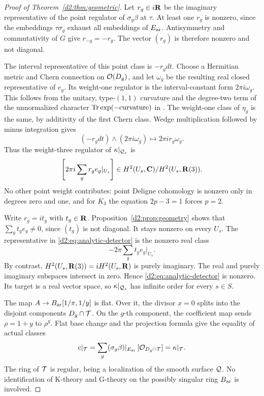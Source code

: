 \begin{proof}[Proof of Theorem~\ref{d2:thm:geometric}]
Let \(r_g\in i\mathbf{R}\) be the imaginary representative of the point
regulator of \(\sigma_g\beta\) at \(\tau\).
At least one \(r_g\) is nonzero, since the embeddings
\(\tau\sigma_g\) exhaust all embeddings of \(E_{\mathrm{ar}}\).
Antisymmetry and commutativity of \(G\) give \(r_{-g}=-r_g\).
The vector \((r_g)\) is therefore nonzero and not diagonal.

The interval representative of this point class is \(-r_gdt\).
Choose a Hermitian metric and Chern connection on \(\mathcal O(D_g)\),
and let \(\omega_g\) be the resulting real closed representative of
\(e_g\). Its weight-one regulator is the interval-constant form
\(2\pi i\omega_g\).
This follows from the unitary, type-\((1,1)\) curvature and the
degree-two term of the unnormalized character
\(\operatorname{Tr}\exp(-\mathrm{curvature})\) in
\cite[Definitions~2.16--2.20]{BunkeTamme}.
The weight-one class of \(\eta_g\) is the same, by additivity of
the first Chern class.
Wedge multiplication followed by minus integration gives
\[
 (-r_gdt)\wedge(2\pi i\omega_g)
 \longmapsto 2\pi i r_g\omega_g.
\]
Thus the weight-three regulator of \(\kappa|_{\mathcal Q_s}\) is
\begin{equation}\label{d2:eq:analytic-detector}
 \left[2\pi i\sum_g r_g e_g|_{U_s}\right]
 \in H^2(U_s,\mathbf{C})/H^2(U_s,\mathbf{R}(3)).
\end{equation}
No other point weight contributes: point Deligne cohomology is
nonzero only in degrees zero and one, and for \(K_3\) the equation
\(2p-3=1\) forces \(p=2\).

Write \(r_g=it_g\) with \(t_g\in\mathbf{R}\).
Proposition~\ref{d2:prop:geometry} shows that
\(\sum_g t_ge_g\ne0\), since \((t_g)\) is not diagonal.
It stays nonzero on every \(U_s\).
The representative in \eqref{d2:eq:analytic-detector} is the nonzero
real class
\[
 -2\pi\sum_g t_ge_g|_{U_s}.
\]
By contrast, \(H^2(U_s,\mathbf{R}(3))=iH^2(U_s,\mathbf{R})\) is purely imaginary.
The real and purely imaginary subspaces intersect in zero.
Hence \eqref{d2:eq:analytic-detector} is nonzero.
Its target is a real vector space, so
\(\kappa|_{\mathcal Q_s}\) has infinite order for every \(s\in S\).

The map \(A\to B_{\mathrm{ar}}[1/\pi,1/y]\) is flat.
Over it, the divisor \(x=0\) splits into the disjoint components
\(D_g\cap\mathcal T\).
On the \(g\)-th component, the coefficient map sends
\(\rho=1+y\) to \(\rho^g\).
Flat base change and the projection formula give the equality of
actual classes
\begin{equation}\label{d2:eq:analytic-splitting}
 c|_{\mathcal T}
 =\sum_g(\sigma_g\beta)|_{E_{\mathrm{ar}}}\,[\mathcal O_{D_g\cap\mathcal T}]
 =\kappa|_{\mathcal T}.
\end{equation}
The ring of \(\mathcal T\) is regular, being a localization of the smooth
surface \(\mathcal Q\). No identification of K-theory and G-theory on the
possibly singular ring \(B_{\mathrm{ar}}\) is involved.


\end{proof}
